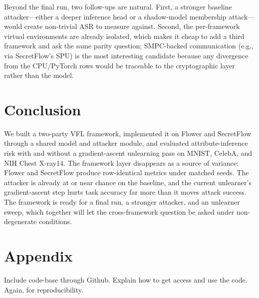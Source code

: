 \documentclass[letterpaper,twocolumn,10pt]{article}
\begin{document}
Beyond the final run, two follow-ups are natural. First, a stronger
baseline attacker---either a deeper inference head or a shadow-model
membership attack---would create non-trivial ASR to measure against.
Second, the per-framework virtual environments are already isolated,
which makes it cheap to add a third framework and ask the same parity
question; SMPC-backed communication (e.g., via SecretFlow's SPU) is
the most interesting candidate because any divergence from the
CPU/PyTorch rows would be traceable to the cryptographic layer rather
than the model.

\section{Conclusion}

We built a two-party VFL framework, implemented it on Flower and
SecretFlow through a shared model and attacker module, and evaluated
attribute-inference risk with and without a gradient-ascent unlearning
pass on MNIST, CelebA, and NIH Chest X-ray14. The framework layer
disappears as a source of variance: Flower and SecretFlow produce
row-identical metrics under matched seeds. The attacker is already at
or near chance on the baseline, and the current unlearner's
gradient-ascent step hurts task accuracy far more than it moves
attack success. The framework is ready for a final run, a stronger
attacker, and an unlearner sweep, which together will let the
cross-framework question be asked under non-degenerate conditions.

\section{Appendix}
Include code-base through Github. Explain how to get access and use the code. Again, for reproducibility.



\end{document}
